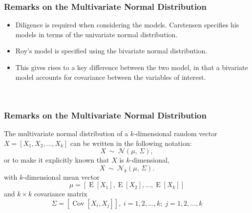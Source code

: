 \documentclass[compress]{beamer}        %
\begin{document}
\begin{frame}
\frametitle{Remarks on the Multivariate Normal Distribution}
\begin{itemize}
\item Diligence is required when considering the models. Carstensen specifies his models in terms of the univariate normal distribution. \item Roy's model is specified using the bivariate normal distribution.
\item 
This gives rises to a key difference between the two model, in that a bivariate model accounts for covariance between the variables of interest.
\end{itemize}
\end{frame}
\begin{frame}\
\frametitle{Remarks on the Multivariate Normal Distribution}
The multivariate normal distribution of a $k$-dimensional random vector $X = [X_1, X_2, \ldots, X_k]$
can be written in the following notation:
\[
    X\ \sim\ \mathcal{N}(\mu,\, \Sigma),
\]
or to make it explicitly known that $X$ is $k$-dimensional,
\[
    X\ \sim\ \mathcal{N}_k(\mu,\, \Sigma).
\]
with $k$-dimensional mean vector
\[ \mu = [ \operatorname{E}[X_1], \operatorname{E}[X_2], \ldots, \operatorname{E}[X_k]] \]
and $k \times k$ covariance matrix
\[ \Sigma = [\operatorname{Cov}[X_i, X_j]], \; i=1,2,\ldots,k; \; j=1,2,\ldots,k \]

\end{frame}
\end{document}
